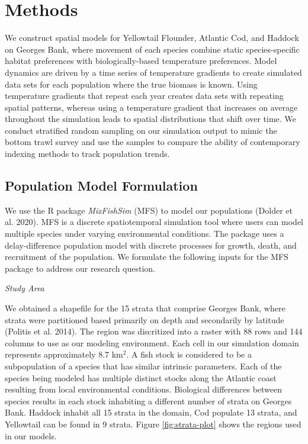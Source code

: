 \documentclass[
  12pt,
]{article}
\begin{document}
\section{Methods}

We construct spatial models for Yellowtail Flounder, Atlantic Cod, and Haddock on Georges Bank, where movement of each species combine static species-specific habitat preferences with biologically-based temperature preferences. Model dynamics are driven by a time series of temperature gradients to create simulated data sets for each population where the true biomass is known. Using temperature gradients that repeat each year creates data sets with repeating spatial patterns, whereas using a temperature gradient that increases on average throughout the simulation leads to spatial distributions that shift over time. We conduct stratified random sampling on our simulation output to mimic the bottom trawl survey and use the samples to compare the ability of contemporary indexing methods to track population trends.

\subsection{Population Model Formulation}

We use the R package \emph{MixFishSim} (MFS) to model our populations (Dolder et al. 2020). MFS is a discrete spatiotemporal simulation tool where users can model multiple species under varying environmental conditions. The package uses a delay-difference population model with discrete processes for growth, death, and recruitment of the population. We formulate the following inputs for the MFS package to address our research question.

\emph{Study Area}

We obtained a shapefile for the 15 strata that comprise Georges Bank, where strata were partitioned based primarily on depth and secondarily by latitude (Politis et al. 2014). The region was discritized into a raster with 88 rows and 144 columns to use as our modeling environment. Each cell in our simulation domain represents approximately 8.7 km\(^2\). A fish stock is considered to be a subpopulation of a species that has similar intrinsic parameters. Each of the species being modeled has multiple distinct stocks along the Atlantic coast resulting from local environmental conditions. Biological differences between species results in each stock inhabiting a different number of strata on Georges Bank. Haddock inhabit all 15 strata in the domain, Cod populate 13 strata, and Yellowtail can be found in 9 strata. Figure \ref{fig:strata-plot} shows the regions used in our models.
\end{document}
